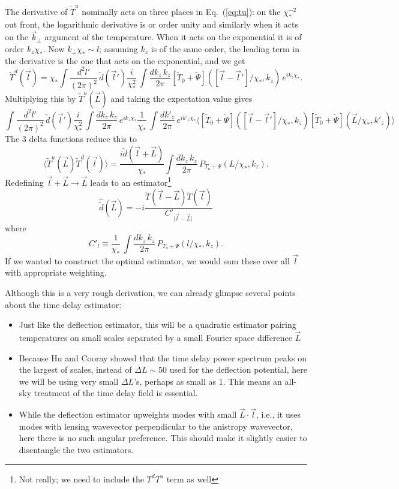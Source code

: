 \documentclass[prd,amsmath,amssymb,floatfix,superscriptaddress,nofootinbib,preprintnumbers]{revtex4-1}
\def\be{\begin{equation}}
\def\ee{\end{equation}}
\newcommand{\ec}[1]{Eq.~(\ref{eq:#1})}
\begin{document}
The derivative of $\tilde T^u$ nominally acts on three places in \ec{tu}: on the $\chi_*^{-2}$ out front, the logarithmic derivative is or order unity and similarly when it acts on the $\vec k_\perp$ argument of the temperature. When it acts on the exponential it is of order $k_z\chi_*$. Now $k_\perp\chi_*\sim l$; assuming $k_z$ is of the same order, the leading term in the derivative is the one that acts on the exponential, and we get
\begin{equation}
\tilde T^d(\vec l) = \chi_*\int \frac{d^2l'}{(2\pi)^2}\, \tilde d(\vec l')
\frac{i}{\chi_*^2}\, \int \frac{dk_z\,k_z}{2\pi}  [\tilde T_0+\tilde\Psi]([\vec l-\vec l']/\chi_*,k_z)\,e^{ik_z\chi_*}.
\end{equation}
Multiplying this by $\tilde T^u(\vec L)$ and taking the expectation value gives
\be
\int \frac{d^2l'}{(2\pi)^2}\, \tilde d(\vec l')
\frac{i}{\chi_*^2}\, \int \frac{dk_z\,k_z}{2\pi}  \,e^{ik_z\chi_*}
\frac{1}{\chi_*}\, \int \frac{dk'_z}{2\pi} \,e^{ik'_z\chi_*}
 \langle [\tilde T_0+\tilde\Psi]([\vec l-\vec l']/\chi_*,k_z)  [\tilde T_0+\tilde\Psi](\vec L/\chi_*,k'_z)\rangle
 \ee
 The 3 delta functions reduce this to
 \be
 \langle \tilde T^u(\vec L) \tilde T^d(\vec l) \rangle
 = \frac{i\tilde d(\vec l + \vec L)}{\chi_*} \int \frac{dk_z\,k_z}{2\pi} \, P_{T_o+\Psi}(L/\chi_*,k_z)
. \ee
 Redefining $\vec l + \vec L \rightarrow \vec L$ leads to an estimator\footnote{Not really; we need to include the $T^dT^u$ term as well}
 \be
 \hat{\tilde d}(\vec L) = -i \frac{\tilde T(\vec l-\vec L) \tilde T(\vec l)}{C'_{\vert\vec l-\vec L\vert}}
 \ee
 where
 \be
 C'_l \equiv  \frac{1}{\chi_*}\, \int \frac{dk_z\,k_z}{2\pi} \, P_{T_o+\Psi}(l/\chi_*,k_z)
 .\ee
If we wanted to construct the optimal estimator, we would sum these over all $\vec l$ with appropriate weighting.

Although this is a very rough derivation, we can already glimpse several points about the time delay estimator:
\begin{itemize}
\item Just like the deflection estimator, this will be a quadratic estimator pairing temperatures on small scales separated by a small Fourier space difference $\vec L$
\item Because Hu and Cooray showed that the time delay power spectrum peaks on the largest of scales, instead of $\Delta L\sim 50$ used for the deflection potential, here we will be using very small $\Delta L$'s, perhaps as small as 1. This means an all-sky treatment of the time delay field is essential.
\item While the deflection estimator upweights modes with small $\vec L\cdot \vec l$, i.e., it uses modes with lensing wavevector perpendicular to the anistropy wavevector, here there is no such angular preference. This should make it slightly easier to disentangle the two estimators.
\end{itemize}
\end{document}
